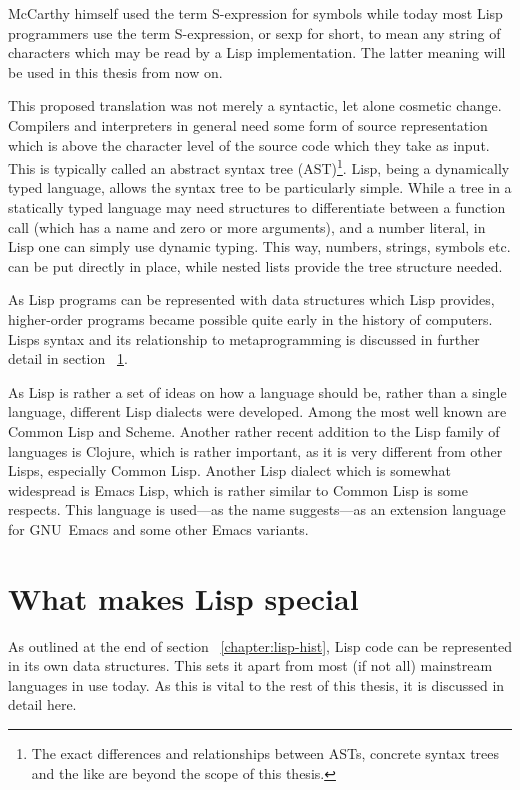 \documentclass[a4paper,10pt,twoside]{report}
\newcommand{\el}{Emacs Lisp}
\newcommand{\cl}{Common Lisp}
\newcommand{\emacs}{GNU~Emacs}
\begin{document}
McCarthy himself used the term S-expression for symbols while today most Lisp
programmers use the term S-expression, or sexp for short, to mean any string of
characters which may be read by a Lisp implementation.  The latter meaning will
be used in this thesis from now on.

This proposed translation was not merely a syntactic, let alone cosmetic change.
Compilers and interpreters in general need some form of source representation
which is above the character level of the source code which they take as input.
This is typically called an abstract syntax tree (AST)\footnote{The exact
  differences and relationships between ASTs, concrete syntax trees and the like
  are beyond the scope of this thesis.}.  Lisp, being a dynamically typed
language, allows the syntax tree to be particularly simple.  While a tree in a
statically typed language may need structures to differentiate between a
function call (which has a name and zero or more arguments), and a number
literal, in Lisp one can simply use dynamic typing.  This way, numbers, strings,
symbols etc. can be put directly in place, while nested lists provide the tree
structure needed.

As Lisp programs can be represented with data structures which Lisp provides,
higher-order programs became possible quite early in the history of computers.
Lisps syntax and its relationship to metaprogramming is discussed in further
detail in section ~\ref{chapter:lisp-special}.

As Lisp is rather a set of ideas on how a language should be, rather than a
single language, different Lisp dialects were developed.  Among the most well
known are \cl{} and Scheme.  Another rather recent addition to the Lisp family
of languages is Clojure, which is rather important, as it is very different from
other Lisps, especially \cl{}.  Another Lisp dialect which is somewhat
widespread is \el{}, which is rather similar to \cl{} is some respects.  This
language is used---as the name suggests---as an extension language for \emacs{}
and some other Emacs variants.

\chapter{What makes Lisp special}
\label{chapter:lisp-special}

As outlined at the end of section ~\ref{chapter:lisp-hist}, Lisp code can be
represented in its own data structures.  This sets it apart from most (if not
all) mainstream languages in use today. As this is vital to the rest of this
thesis, it is discussed in detail here.
\end{document}
